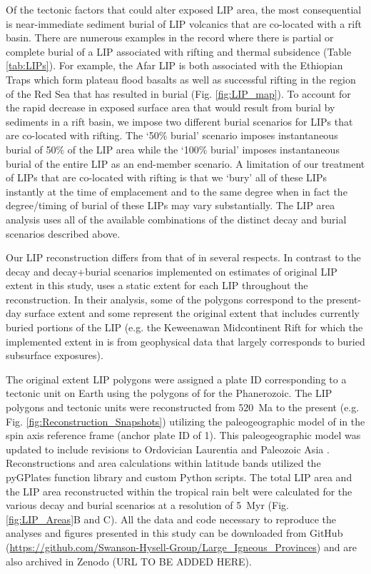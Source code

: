 \documentclass[11pt,letterpaper]{article}
\begin{document}
Of the tectonic factors that could alter exposed LIP area, the most consequential is near-immediate sediment burial of LIP volcanics that are co-located with a rift basin. There are numerous examples in the record where there is partial or complete burial of a LIP associated with rifting and thermal subsidence (Table \ref{tab:LIPs}). For example, the Afar LIP is both associated with the Ethiopian Traps which form plateau flood basalts as well as successful rifting in the region of the Red Sea that has resulted in burial (Fig. \ref{fig:LIP_map}). To account for the rapid decrease in exposed surface area that would result from burial by sediments in a rift basin, we impose two different burial scenarios for LIPs that are co-located with rifting. The `50\% burial' scenario imposes instantaneous burial of 50$\%$ of the LIP area while the `100\% burial' imposes instantaneous burial of the entire LIP as an end-member scenario. A limitation of our treatment of LIPs that are co-located with rifting is that we `bury' all of these LIPs instantly at the time of emplacement and to the same degree when in fact the degree/timing of burial of these LIPs may vary substantially. The LIP area analysis uses all of the available combinations of the distinct decay and burial scenarios described above. 

Our LIP reconstruction differs from that of \citet{Johansson2018a} in several respects. In contrast to the decay and decay+burial scenarios implemented on estimates of original LIP extent in this study, \citet{Johansson2018a} uses a static extent for each LIP throughout the reconstruction. In their analysis, some of the polygons correspond to the present-day surface extent and some represent the original extent that includes currently buried portions of the LIP (e.g. the Keweenawan Midcontinent Rift for which the implemented extent in \citet{Johansson2018a} is from geophysical data that largely corresponds to buried subsurface exposures).

The original extent LIP polygons were assigned a plate ID corresponding to a tectonic unit on Earth using the polygons of \citet{Torsvik2016a} for the Phanerozoic. The LIP polygons and tectonic units were reconstructed from 520~Ma to the present (e.g. Fig. \ref{fig:Reconstruction_Snapshots}) utilizing the paleogeographic model of \citet{Torsvik2016a} in the spin axis reference frame (anchor plate ID of 1). This paleogeographic model was updated to include revisions to Ordovician Laurentia \citep{Swanson-Hysell2017a} and Paleozoic Asia \citep{Domeier2018a}. Reconstructions and area calculations within latitude bands utilized the pyGPlates function library and custom Python scripts. The total LIP area and the LIP area reconstructed within the tropical rain belt were calculated for the various decay and burial scenarios at a resolution of 5~Myr (Fig. \ref{fig:LIP_Areas}B and C). All the data and code necessary to reproduce the analyses and figures presented in this study can be downloaded from GitHub (\url{https://github.com/Swanson-Hysell-Group/Large_Igneous_Provinces}) and are also archived in Zenodo (URL TO BE ADDED HERE).
\end{document}
